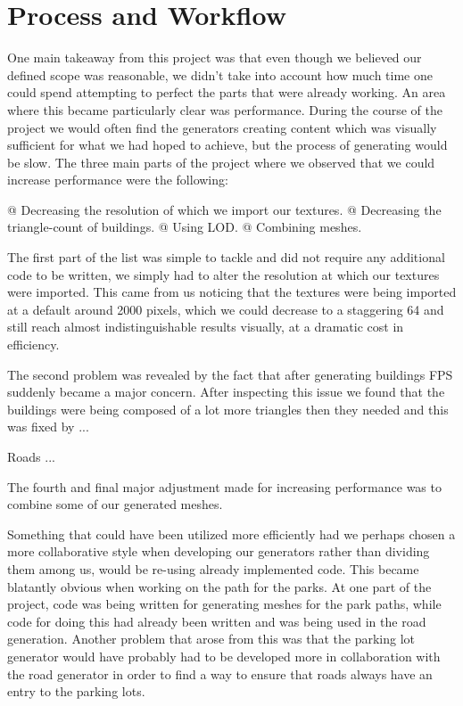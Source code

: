 \section{Process and Workflow}

One main takeaway from this project was that even though we believed our defined scope was reasonable, we didn't take into account how much time one could spend attempting to perfect the parts that were already working.
An area where this became particularly clear was performance.
During the course of the project we would often find the generators creating content which was visually sufficient for what we had hoped to achieve, but the process of generating would be slow. 
The three main parts of the project where we observed that we could increase performance were the following:
\begin{easylist}
  @ Decreasing the resolution of which we import our textures.
  @ Decreasing the triangle-count of buildings.
  @ Using LOD.
  @ Combining meshes. 
 \end{easylist}
 
The first part of the list was simple to tackle and did not require any additional code to be written, we simply had to alter the resolution at which our textures were imported.
This came from us noticing that the textures were being imported at a default around 2000 pixels, which we could decrease to a staggering 64 and still reach almost indistinguishable results visually, at a dramatic cost in efficiency. 

The second problem was revealed by the fact that after generating buildings FPS suddenly became a major concern. 
After inspecting this issue we found that the buildings were being composed of a lot more triangles then they needed and this was fixed by ...

Roads ... %

The fourth and final major adjustment made for increasing performance was to combine some of our generated meshes. 

Something that could have been utilized more efficiently had we perhaps chosen a more collaborative style when developing our generators rather than dividing them among us, would be re-using already implemented code. 
This became blatantly obvious when working on the path for the parks.
At one part of the project, code was being written for generating meshes for the park paths, while code for doing this had already been written and was being used in the road generation. 
Another problem that arose from this was that the parking lot generator would have probably had to be developed more in collaboration with the road generator in order to find a way to ensure that roads always have an entry to the parking lots.




